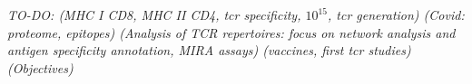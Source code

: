\textit{TO-DO:
(MHC I CD8, MHC II CD4, tcr specificity, $10^15$, tcr generation)
(Covid: proteome, epitopes)
(Analysis of TCR repertoires: focus on network analysis and antigen specificity annotation, MIRA assays)
(vaccines, first tcr studies)
(Objectives)}








